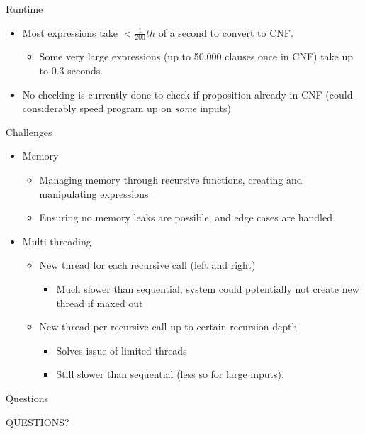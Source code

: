\documentclass{beamer}
\begin{document}
\begin{frame}{Runtime}
    \begin{itemize}
        \setlength\itemsep{1em}
        \item Most expressions take $< \frac{1}{200}{th}$ of a second to convert to CNF.
        \begin{itemize}
            \item Some very large expressions (up to 50,000 clauses once in CNF) take up to 0.3 seconds.
        \end{itemize}
        \item No checking is currently done to check if proposition already in CNF (could considerably speed program up on \textit{some} inputs)
    \end{itemize}
\end{frame}

\begin{frame}{Challenges}
    \begin{itemize}
        \setlength\itemsep{1em}
        \item Memory
        \begin{itemize}
            \item Managing memory through recursive functions, creating and manipulating expressions
            \item Ensuring no memory leaks are possible, and edge cases are handled
        \end{itemize}
        \item Multi-threading
        \begin{itemize}
            \item New thread for each recursive call (left and right)
            \begin{itemize}
                \item Much slower than sequential, system could potentially not create new thread if maxed out
            \end{itemize}
            \item New thread per recursive call up to certain recursion depth
            \begin{itemize}
                \item Solves issue of limited threads
                \item Still slower than sequential (less so for large inputs). 
            \end{itemize}
        \end{itemize}
    \end{itemize}
\end{frame}

\begin{frame}{Questions}
    \begin{center}
        \Huge QUESTIONS?
    \end{center}
\end{frame}
\end{document}
